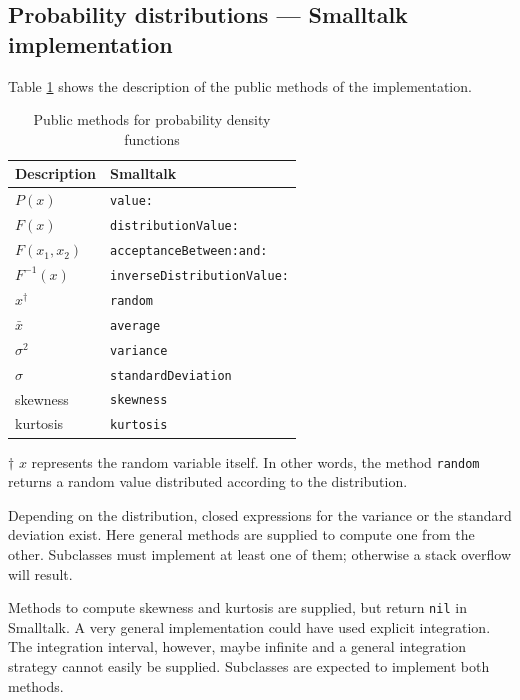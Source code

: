 \subsection{Probability distributions --- Smalltalk implementation}
 Table
\ref{tb:distrgenimpl} shows the description of the public methods
of the implementation.
\begin{table}[h]
  \centering
  \caption{Public methods for probability density functions}
  \label{tb:distrgenimpl}
\vspace{1 ex}
\begin{tabular}{|l | l |} \hline
  Description & \hfil Smalltalk \\ \hline
  $P\left(x\right)$ & {\tt value:} \\
  $F\left(x\right)$ & {\tt distributionValue:} \\
  $F\left(x_1,x_2\right)$ & {\tt acceptanceBetween:and:} \\
  $F^{-1}\left(x\right)$ & {\tt inverseDistributionValue:} \\
  $x^{\dag}$ & {\tt random} \\
  \hline
  $\bar{x}$ & {\tt average} \\
  $\sigma^2$ & {\tt variance} \\
  $\sigma$ & {\tt standardDeviation} \\
  skewness & {\tt skewness} \\
  kurtosis & {\tt kurtosis} \\
  \hline
\end{tabular}
$\dag$ $x$ represents the random variable itself. In other words,
the method {\tt random} returns a random value distributed
according to the distribution.
\end{table}

Depending on the distribution, closed expressions for the variance
or the standard deviation exist. Here general methods are supplied
to compute one from the other. Subclasses must implement at least
one of them; otherwise a stack overflow will result.

Methods to compute skewness and kurtosis are supplied, but return
{\tt nil} in Smalltalk. A very general
implementation could have used explicit integration. The
integration interval, however, maybe infinite and a general
integration strategy cannot easily be supplied. Subclasses are
expected to implement both methods.

